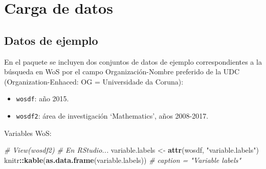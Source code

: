 \documentclass[]{book}
\newenvironment{Shaded}{\begin{snugshade}}{\end{snugshade}}
\newcommand{\KeywordTok}[1]{\textcolor[rgb]{0.13,0.29,0.53}{\textbf{#1}}}
\newcommand{\StringTok}[1]{\textcolor[rgb]{0.31,0.60,0.02}{#1}}
\newcommand{\CommentTok}[1]{\textcolor[rgb]{0.56,0.35,0.01}{\textit{#1}}}
\newcommand{\OperatorTok}[1]{\textcolor[rgb]{0.81,0.36,0.00}{\textbf{#1}}}
\newcommand{\NormalTok}[1]{#1}
\begin{document}
\section{Carga de datos}\label{carga-de-datos}

\subsection{Datos de ejemplo}\label{datos-de-ejemplo-1}

En el paquete se incluyen dos conjuntos de datos de ejemplo
correspondientes a la búsqueda en WoS por el campo Organización-Nombre
preferido de la UDC (Organization-Enhaced: OG = Universidade da Coruna):

\begin{itemize}
\item
  \texttt{wosdf}: año 2015.
\item
  \texttt{wosdf2}: área de investigación `Mathematics', años 2008-2017.
\end{itemize}

Variables WoS:

\begin{Shaded}
\begin{Highlighting}[]
\CommentTok{# View(wosdf2) # En RStudio...}
\NormalTok{variable.labels <-}\StringTok{ }\KeywordTok{attr}\NormalTok{(wosdf, }\StringTok{"variable.labels"}\NormalTok{)}
\NormalTok{knitr}\OperatorTok{::}\KeywordTok{kable}\NormalTok{(}\KeywordTok{as.data.frame}\NormalTok{(variable.labels)) }\CommentTok{# caption = "Variable labels"}
\end{Highlighting}
\end{Shaded}
\end{document}

